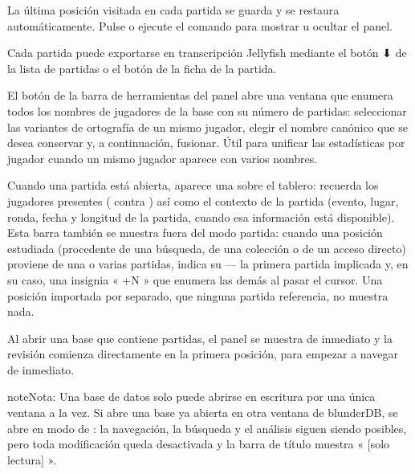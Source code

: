 \documentclass[letterpaper,10pt,spanish]{sphinxmanual}
\begin{document}
\sphinxAtStartPar
La última posición visitada en cada partida se guarda y se restaura automáticamente. Pulse  o ejecute el comando  para mostrar u ocultar el panel.

\sphinxAtStartPar
Cada partida puede exportarse en transcripción Jellyfish  mediante el botón ⬇ de la lista de partidas o el botón  de la ficha de la partida.

\sphinxAtStartPar
El botón  de la barra de herramientas del panel abre una ventana que enumera todos los nombres de jugadores de la base con su número de partidas: seleccionar las variantes de ortografía de un mismo jugador, elegir el nombre canónico que se desea conservar y, a continuación, fusionar. Útil para unificar las estadísticas por jugador cuando un mismo jugador aparece con varios nombres.

\sphinxAtStartPar
Cuando una partida está abierta, aparece una  sobre el tablero: recuerda los jugadores presentes ( contra ) así como el contexto de la partida (evento, lugar, ronda, fecha y longitud de la partida, cuando esa información está disponible). Esta barra también se muestra fuera del modo partida: cuando una posición estudiada (procedente de una búsqueda, de una colección o de un acceso directo) proviene de una o varias partidas, indica su  — la primera partida implicada y, en su caso, una insignia « +N » que enumera las demás al pasar el cursor. Una posición importada por separado, que ninguna partida referencia, no muestra nada.

\sphinxAtStartPar
Al abrir una base que contiene partidas, el panel  se muestra de inmediato y la revisión comienza directamente en la primera posición, para empezar a navegar de inmediato.

\begin{sphinxadmonition}{note}{Nota:}
\sphinxAtStartPar
Una base de datos solo puede abrirse en escritura por una única ventana a la vez. Si abre una base ya abierta en otra ventana de blunderDB, se abre en modo de : la navegación, la búsqueda y el análisis siguen siendo posibles, pero toda modificación queda desactivada y la barra de título muestra « {[}solo lectura{]} ».
\end{sphinxadmonition}
\end{document}
